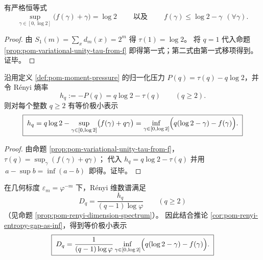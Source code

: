 \begin{corollary}[全息守恒律：\texorpdfstring{$\log 2=\sup_\gamma(f(\gamma)+\gamma)$}{log2=sup(f+g)}]\label{cor:pom-holographic-conservation-f-plus-gamma}
有严格恒等式
\[
\boxed{\;\sup_{\gamma\in[0,\log 2]}\bigl(f(\gamma)+\gamma\bigr)=\log 2\;}
\qquad\text{以及}\qquad
\boxed{\;f(\gamma)\le \log 2-\gamma\ \ (\forall\gamma).\;}
\]
\end{corollary}
\begin{proof}
由 \(S_1(m)=\sum_x d_m(x)=2^m\) 得 \(\tau(1)=\log 2\)。
将 \(q=1\) 代入命题 \ref{prop:pom-variational-unity-tau-from-f} 即得第一式；第二式由第一式移项得到。证毕。
\end{proof}

\begin{corollary}\label{cor:pom-renyi-entropy-gap-as-inf}
沿用定义 \ref{def:pom-moment-pressure} 的归一化压力 \(P(q)=\tau(q)-q\log 2\)，并令 Rényi 熵率
\[
h_q:=-P(q)=q\log 2-\tau(q)\qquad(q\ge 2).
\]
则对每个整数 \(q\ge 2\) 有等价极小表示
\[
\boxed{\;
h_q
=q\log 2-\sup_{\gamma\in[0,\log 2]}\bigl(f(\gamma)+q\gamma\bigr)
=\inf_{\gamma\in[0,\log 2]}\Bigl(q(\log 2-\gamma)-f(\gamma)\Bigr).\;}
\]
\end{corollary}
\begin{proof}
由命题 \ref{prop:pom-variational-unity-tau-from-f}，
\(
\tau(q)=\sup_{\gamma}(f(\gamma)+q\gamma)
\)；
代入 \(h_q=q\log 2-\tau(q)\) 并用 \(\,a-\sup b=\inf(a-b)\,\) 即得。证毕。
\end{proof}

\begin{corollary}\label{cor:pom-dimension-spectrum-gap-min-principle}
在几何标度 \(\varepsilon_m=\varphi^{-m}\) 下，Rényi 维数谱满足
\[
D_q=\frac{h_q}{(q-1)\log\varphi}\qquad(q\ge 2)
\]
（见命题 \ref{prop:pom-renyi-dimension-spectrum}）。
因此结合推论 \ref{cor:pom-renyi-entropy-gap-as-inf}，得到等价极小表示
\[
\boxed{\;
D_q
=\frac{1}{(q-1)\log\varphi}\inf_{\gamma\in[0,\log 2]}
\Bigl(q(\log 2-\gamma)-f(\gamma)\Bigr).\;}
\]
\end{corollary}


